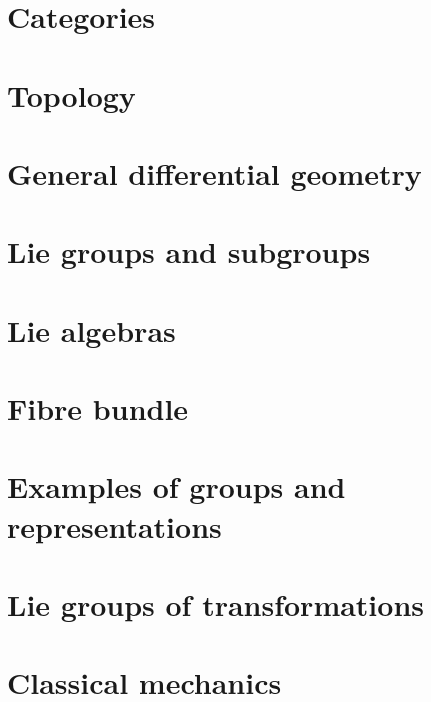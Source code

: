 \chapter{Categories}        \label{chap_category}


\chapter{Topology}              \label{chap_topology}



\chapter{General differential geometry} \label{Chapitre_FB}


\chapter{Lie groups and subgroups}


\chapter{Lie algebras}
  
 





\chapter{Fibre bundle}



\chapter{Examples of groups and representations}        \label{ChapThoComsGroupes}



\chapter{Lie groups of transformations}


\chapter{Classical mechanics}



